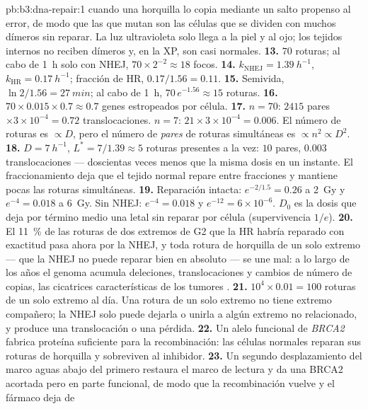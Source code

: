 \begin{solution}{pb:b3:dna-repair:1}
cuando una horquilla lo copia mediante un salto propenso al error, de
modo que las que mutan son las células que se dividen con muchos dímeros
sin reparar. La luz ultravioleta solo llega a la piel y al ojo; los
tejidos internos no reciben dímeros y, en la XP, son casi normales.
\textbf{13.} $70$ roturas; al cabo de \qty{1}{h} solo con NHEJ, $70\times
2^{-2} \approx 18$ focos.
\textbf{14.} $k_{\text{NHEJ}} = \qty{1.39}{h^{-1}}$, $k_{\text{HR}} =
\qty{0.17}{h^{-1}}$; fracción de HR, $0.17/1.56 = 0.11$.
\textbf{15.} Semivida, $\ln 2/1.56 = \qty{27}{min}$; al cabo de
\qty{1}{h}, $70\,e^{-1.56} \approx 15$ roturas.
\textbf{16.} $70\times 0.015\times 0.7 \approx 0.7$ genes estropeados por
célula.
\textbf{17.} $n = 70$: $2415$ pares $\times 3\times 10^{-4} = 0.72$
translocaciones. $n = 7$: $21\times 3\times 10^{-4} = 0.006$. El número
de roturas es $\propto D$, pero el número de \emph{pares} de roturas
simultáneas es $\propto n^{2} \propto D^{2}$.
\textbf{18.} $D = \qty{7}{h^{-1}}$, $L^{*} = 7/1.39 \approx 5$ roturas
presentes a la vez: $10$ pares, $0.003$ translocaciones --- doscientas
veces menos que la misma dosis en un instante. El fraccionamiento deja
que el tejido normal repare entre fracciones y mantiene pocas las
roturas simultáneas.
\textbf{19.} Reparación intacta: $e^{-2/1.5} = 0.26$ a \qty{2}{Gy} y
$e^{-4} = 0.018$ a \qty{6}{Gy}. Sin NHEJ: $e^{-4} = 0.018$ y
$e^{-12} = 6\times 10^{-6}$. $D_{0}$ es la dosis que deja por término
medio una  letal sin reparar por célula (supervivencia $1/e$).
\textbf{20.} El \qty{11}{\%} de las roturas de dos extremos de G2 que la
HR habría reparado con exactitud pasa ahora por la NHEJ, y toda rotura
de horquilla de un solo extremo --- que la NHEJ no puede reparar bien en
absoluto --- se une mal: a lo largo de los años el genoma acumula
deleciones, translocaciones y cambios de número de copias, las cicatrices
características de los tumores \emph{}.
\textbf{21.} $10^{4}\times 0.01 = 100$ roturas de un solo extremo al día.
Una rotura de un solo extremo no tiene extremo compañero; la NHEJ solo
puede dejarla o unirla a algún extremo no relacionado, y produce una
translocación o una pérdida.
\textbf{22.} Un alelo funcional de \emph{BRCA2} fabrica proteína
suficiente para la recombinación: las células normales reparan sus
roturas de horquilla y sobreviven al inhibidor.
\textbf{23.} Un segundo desplazamiento del marco aguas abajo del primero
restaura el marco de lectura y da una BRCA2 acortada pero en parte
funcional, de modo que la recombinación vuelve y el fármaco deja de

\end{solution}
